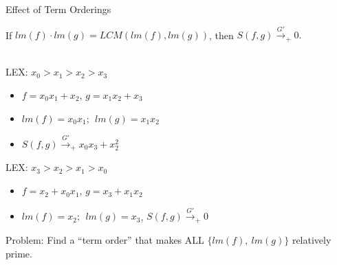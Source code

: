 \documentclass[xcolor=dvipsnames]{beamer}
\begin{document}
\begin{frame}{\large Effect of Term Orderings}

If $lm(f) \cdot lm(g) = LCM(lm(f), lm(g))$, 
then $S(f,g)\stackrel{G'}{\textstyle\longrightarrow}_+ 0.$\\
\ \\
{\small
LEX: $x_0 > x_1 > x_2 > x_3$
\begin{itemize}
\item $f=x_0 x_1+x_2$, $g=x_1x_2+x_3$
\item $lm(f) = x_0 x_1; ~~ lm(g) = x_1 x_2$
\item $S(f, g) \stackrel{G'}{\textstyle\longrightarrow}_+ x_0x_3 + x_2^2$
\end{itemize}

LEX: $x_3 > x_2 > x_1 > x_0$
\begin{itemize}
\item $f=x_2 + x_0 x_1$, $g=x_3 + x_1x_2$
\item $lm(f) = x_2; ~~ lm(g) = x_3$, $S(f, g) \stackrel{G'}{\textstyle\longrightarrow}_+ 0$
\end{itemize}
}

Problem: Find a ``term order'' that makes ALL $\{lm(f), ~lm(g)\}$ 
relatively prime.

\end{frame}
\end{document}
